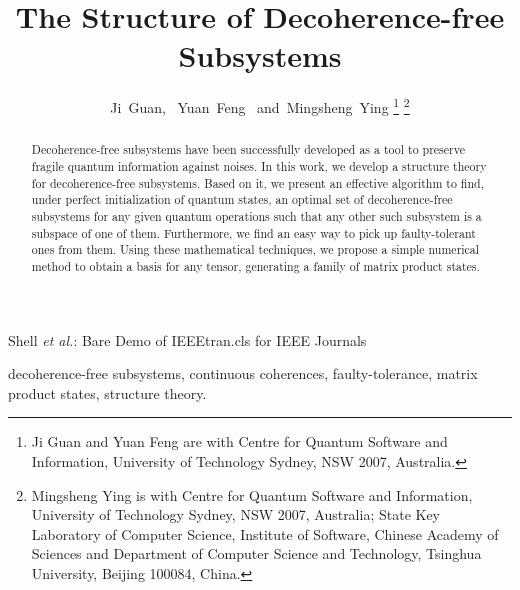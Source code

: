\documentclass[journal]{IEEEtran}
\begin{document}
 \title{The Structure  of Decoherence-free Subsystems}
 
\author{Ji~Guan,%
        ~Yuan~Feng%
        ~and~Mingsheng~Ying%
\thanks{Ji Guan and Yuan Feng are with Centre for Quantum Software and Information,
University of Technology Sydney, NSW 2007, Australia.}%
\thanks{Mingsheng Ying is with Centre for Quantum Software and Information,
University of Technology Sydney, NSW 2007, Australia; State Key Laboratory of Computer Science, Institute of Software, Chinese Academy of Sciences and Department of Computer Science and Technology, Tsinghua University, Beijing 100084, China.}}%

{Shell \MakeLowercase{\textit{et al.}}: Bare Demo of IEEEtran.cls for IEEE Journals}
 \maketitle

\begin{abstract}
Decoherence-free subsystems have been successfully developed as a tool to preserve fragile quantum information against noises.  In this work, we develop a structure theory for decoherence-free subsystems. Based on it, we present an effective algorithm to find, under perfect initialization of quantum states, an optimal set of  decoherence-free subsystems for any given quantum operations such that any other such subsystem is a subspace of one of them. Furthermore, we find  an easy way to pick up faulty-tolerant ones from them. Using these mathematical techniques, we propose a simple numerical  method to obtain a basis for any tensor, generating  a family of matrix product states.
\end{abstract}

\begin{IEEEkeywords}
decoherence-free subsystems, continuous coherences, faulty-tolerance, matrix product states, structure theory.
\end{IEEEkeywords}

 \IEEEpeerreviewmaketitle
\end{document}
